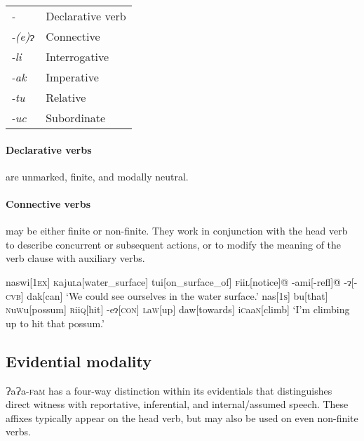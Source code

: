 \documentclass[a4paper,10pt,twoside,openright]{memoir}
\newcommand{\lang}{{\bigglot}a{\bigglot}a-\textsc{f}a\textsc{m}}
\newcommand{\bigglot}{Ɂ}
\newcommand{\lilglot}{ɂ}
\newcommand{\nm}{\symbol{"2205}}
\newcommand{\famwordold}[5]{#1\textsc{#2}#3\textsc{#4}#5}
\begin{document}
\begin{table}[ht]
    \centering
    \begin{tabular}{>{\em}ll}
        -\nm        & Declarative verb \\
        -(e)\lilglot   & Connective \\
        -li         & Interrogative \\
        -ak         & Imperative \\
        -tu         & Relative \\
        -uc         & Subordinate \\
    \end{tabular}
\end{table}

\paragraph{Declarative verbs} are unmarked, finite, and modally neutral.

\paragraph{Connective verbs} may be either finite or non-finite. They work in conjunction with the head verb to describe concurrent or subsequent actions, or to modify the meaning of the verb clause with auxiliary verbs.

\pex[interpartskip=3ex]
\a
\begingl
naswi[\textsc{1ex}]
\famwordold{}{k}{aju}{l}{a}[water\_surface]
tui[on\_surface\_of]
\famwordold{}{f}{ii}{l}{}[notice]@
-ami[\sc -refl]@
-\lilglot[-\textsc{cvb}]
dak[can]
\glft `We could see ourselves in the water surface.'
\endgl
\a
\begingl
nas[\textsc{1s}]
bu[that]
\famwordold{}{n}{u}{w}{u}[possum]
\famwordold{}{r}{ii}{q}{}[hit]
-e\lilglot[\textsc{con}]
\famwordold{}{l}{a}{w}{}[up]
daw[towards]
\famwordold{i}{c}{aa}{n}{}[climb]
\glft `I'm climbing up to hit that possum.'
\endgl
\xe

\subsection{Evidential modality}

\lang{} has a four-way distinction within its evidentials that distinguishes direct witness with reportative, inferential, and internal/assumed speech. These affixes typically appear on the head verb, but may also be used on even non-finite verbs.
\end{document}

